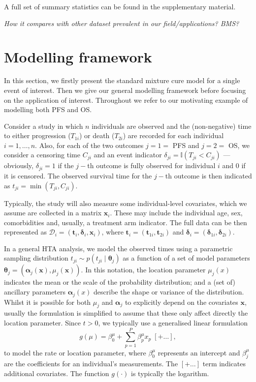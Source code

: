 \documentclass[AMA,STIX1COL]{WileyNJD-v2}
\begin{document}
A full set of summary statistics can be found in the supplementary material.

{\it How it compares with other dataset prevalent in our field/applications? BMS?}

%
\section{Modelling framework}\label{sec:methods}
In this section, we firstly present the standard mixture cure model for a single event of interest.
Then we give our general modelling framework before focusing on the application of interest.
Throughout we refer to our motivating example of modelling both PFS and OS.

Consider a study in which $n$ individuals are observed and the (non-negative) time to either progression ($T_{1i}$) or death ($T_{2i}$) are recorded for each individual $i=1,\ldots,n$.
Also, for each of the two outcomes $j=1=$ PFS and $j=2=$ OS, we consider a censoring time $C_{ji}$ and an event indicator $\delta_{ji} = \mathbb{I}(T_{ji} < C_{ji})$
--- obviously, $\delta_{ji} = 1$ if the $j-$th outcome is fully observed for individual $i$ and 0 if it is censored.
The observed survival time for the $j-$th outcome is then indicated as $t_{ji} = \min(T_{ji}, C_{ji})$.

Typically, the study will also measure some individual-level covariates, which we assume are collected in a matrix $\bm{x}_i$.
These may include the individual age, sex, comorbidities and, usually, a treatment arm indicator.
The full data can be then represented as
$\mathcal{D}_i = (\bm{t}_i, \bm{\delta}_i, \bm{x}_i)$,
where $\bm{t}_i = (\bm{t}_{1i}, \bm{t}_{2i})$ and $\bm{\delta}_i = (\bm{\delta}_{1i}, \bm\delta_{2i})$.

In a general HTA analysis, we model the observed times using a parametric sampling distribution $t_{ji} \sim p(t_{ji} \mid \bm\theta_j)$ as a function of a set of model parameters $\bm\theta_j = (\bm\alpha_j(\bm x), \mu_j(\bm x))$. 
In this notation, the location parameter $\mu_j(x)$ indicates the mean or the scale of the probability distribution; and a (set of) ancillary parameters $\bm \alpha_j(x)$ describe the shape or variance of the distribution.
Whilst it is possible for both $\mu_j$ and $\bm\alpha_j$ to explicitly depend on the covariates $\bm x$, usually the formulation is simplified to assume that these only affect directly the location parameter.
Since $t > 0$, we typically use a generalised linear formulation
$$
g(\mu) = \beta^{\mu}_0 + \sum_{p=1}^P \beta^{\mu}_p x_p \; [+ \ldots ],
$$
to model the rate or location parameter,
where $\beta^{\mu}_0$ represents an intercept and $\beta^{\mu}_j$ are the coefficients for an individual's measurements.
The $[+ \ldots]$ term indicates additional covariates.
The function $g(\cdot)$ is typically the logarithm.
\end{document}
